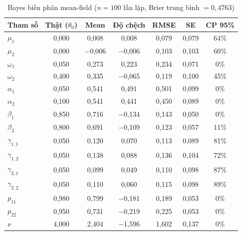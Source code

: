 \documentclass[11pt,a4paper]{article}
\begin{document}
\begin{table}[H]\centering\footnotesize
\caption{Bayes biến phân mean-field ($n=100$ lần lặp, Brier trung bình $=0,4763$)}
\begin{tabularx}{\textwidth}{l C C C C C C}
\toprule
\textbf{Tham số} & \textbf{Thật ($\theta_0$)} & \textbf{Mean} & \textbf{Độ chệch} & \textbf{RMSE} & \textbf{SE} & \textbf{CP 95\%} \\
\midrule
$\mu_1$ & 0,000 & 0,008 & 0,008 & 0,079 & 0,079 & 64\% \\
$\mu_2$ & 0,000 & $-$0,006 & $-$0,006 & 0,103 & 0,103 & 60\% \\
$\omega_1$ & 0,050 & 0,273 & 0,223 & 0,234 & 0,071 & 0\% \\
$\omega_2$ & 0,400 & 0,335 & $-$0,065 & 0,119 & 0,100 & 45\% \\
$\alpha_1$ & 0,050 & 0,541 & 0,491 & 0,501 & 0,099 & 0\% \\
$\alpha_2$ & 0,100 & 0,541 & 0,441 & 0,450 & 0,089 & 0\% \\
$\beta_1$ & 0,850 & 0,716 & $-$0,134 & 0,143 & 0,050 & 0\% \\
$\beta_2$ & 0,800 & 0,691 & $-$0,109 & 0,123 & 0,057 & 11\% \\
$\gamma_{1,1}$ & 0,050 & 0,120 & 0,070 & 0,113 & 0,089 & 81\% \\
$\gamma_{1,2}$ & 0,050 & 0,138 & 0,088 & 0,136 & 0,104 & 72\% \\
$\gamma_{2,1}$ & 0,050 & 0,099 & 0,049 & 0,110 & 0,098 & 87\% \\
$\gamma_{2,2}$ & 0,050 & 0,110 & 0,060 & 0,115 & 0,098 & 89\% \\
$p_{11}$ & 0,980 & 0,799 & $-$0,181 & 0,189 & 0,053 & 0\% \\
$p_{22}$ & 0,950 & 0,731 & $-$0,219 & 0,225 & 0,053 & 0\% \\
$\nu$ & 4,000 & 2,404 & $-$1,596 & 1,602 & 0,137 & 0\% \\
\bottomrule
\end{tabularx}
\end{table}
\end{document}
